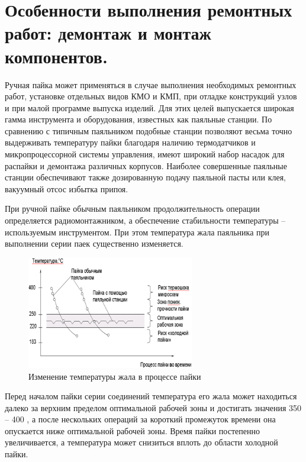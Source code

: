 \documentclass[unicode, 12pt, a4paper, oneside]{article}
\begin{document}
\section{Особенности выполнения ремонтных работ: демонтаж и монтаж компонентов.}

Ручная пайка может применяться в случае выполнения необходимых ремонтных работ, установке отдельных видов КМО и КМП, при отладке конструкций узлов и при малой программе выпуска изделий.  Для этих целей выпускается широкая гамма инструмента и оборудования, известных как паяльные станции. По сравнению с типичным паяльником подобные станции позволяют весьма точно выдерживать температуру пайки благодаря наличию термодатчиков и микропроцессорной системы управления, имеют широкий набор насадок для распайки  и демонтажа различных корпусов. Наиболее совершенные паяльные станции обеспечивают также дозированную подачу паяльной пасты или клея, вакуумный отсос избытка припоя.

При ручной пайке обычным паяльником продолжительность операции определяется радиомонтажником, а обеспечение стабильности температуры – используемым инструментом. При этом температура жала паяльника при выполнении серии паек существенно изменяется.

\begin{figure}[htbp]
\centering
\includegraphics[width=0.65\textwidth]{90_soldering.png}
\caption{Изменение температуры жала в процессе пайки}
\label{fig:90_soldering}
\end{figure}

Перед началом пайки серии соединений температура его жала может находиться далеко за верхним пределом оптимальной рабочей зоны и достигать значения 350 – 400 \textcelsius, а после нескольких операций за короткий промежуток времени она опускается ниже оптимальной рабочей зоны. Время пайки постепенно увеличивается, а температура может снизиться вплоть до области холодной пайки.
\end{document}
